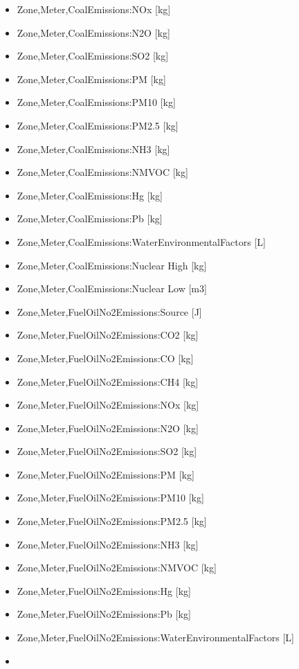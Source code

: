 \begin{itemize}
\item
  Zone,Meter,CoalEmissions:NOx {[}kg{]}
\item
  Zone,Meter,CoalEmissions:N2O {[}kg{]}
\item
  Zone,Meter,CoalEmissions:SO2 {[}kg{]}
\item
  Zone,Meter,CoalEmissions:PM {[}kg{]}
\item
  Zone,Meter,CoalEmissions:PM10 {[}kg{]}
\item
  Zone,Meter,CoalEmissions:PM2.5 {[}kg{]}
\item
  Zone,Meter,CoalEmissions:NH3 {[}kg{]}
\item
  Zone,Meter,CoalEmissions:NMVOC {[}kg{]}
\item
  Zone,Meter,CoalEmissions:Hg {[}kg{]}
\item
  Zone,Meter,CoalEmissions:Pb {[}kg{]}
\item
  Zone,Meter,CoalEmissions:WaterEnvironmentalFactors {[}L{]}
\item
  Zone,Meter,CoalEmissions:Nuclear High {[}kg{]}
\item
  Zone,Meter,CoalEmissions:Nuclear Low {[}m3{]}
\item
  Zone,Meter,FuelOilNo2Emissions:Source {[}J{]}
\item
  Zone,Meter,FuelOilNo2Emissions:CO2 {[}kg{]}
\item
  Zone,Meter,FuelOilNo2Emissions:CO {[}kg{]}
\item
  Zone,Meter,FuelOilNo2Emissions:CH4 {[}kg{]}
\item
  Zone,Meter,FuelOilNo2Emissions:NOx {[}kg{]}
\item
  Zone,Meter,FuelOilNo2Emissions:N2O {[}kg{]}
\item
  Zone,Meter,FuelOilNo2Emissions:SO2 {[}kg{]}
\item
  Zone,Meter,FuelOilNo2Emissions:PM {[}kg{]}
\item
  Zone,Meter,FuelOilNo2Emissions:PM10 {[}kg{]}
\item
  Zone,Meter,FuelOilNo2Emissions:PM2.5 {[}kg{]}
\item
  Zone,Meter,FuelOilNo2Emissions:NH3 {[}kg{]}
\item
  Zone,Meter,FuelOilNo2Emissions:NMVOC {[}kg{]}
\item
  Zone,Meter,FuelOilNo2Emissions:Hg {[}kg{]}
\item
  Zone,Meter,FuelOilNo2Emissions:Pb {[}kg{]}
\item
  Zone,Meter,FuelOilNo2Emissions:WaterEnvironmentalFactors {[}L{]}
\item

\end{itemize}
